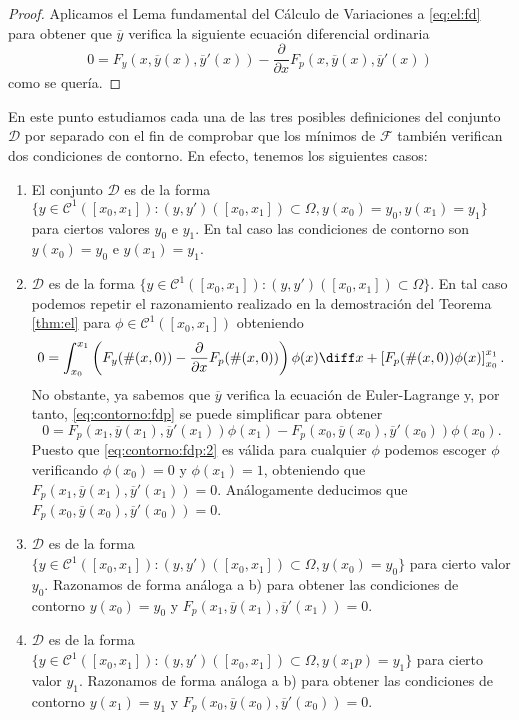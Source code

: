 \documentclass{article}
\begin{document}
\begin{proof}
  Aplicamos el Lema fundamental del Cálculo de Variaciones a \eqref{eq:el:fd} para obtener que
  $\overline{y}$ verifica la siguiente ecuación diferencial ordinaria
  \begin{equation} \label{eq:ex:edo} 0 = F_y(x, \overline{y}(x), \overline{y}'(x)) -
    \frac{\partial}{\partial x} F_p(x, \overline{y}(x), \overline{y}'(x))
  \end{equation}
  como se quería.
\end{proof}

En este punto estudiamos cada una de las tres posibles definiciones del conjunto $\mathcal{D}$ por
separado con el fin de comprobar que los mínimos de $\mathcal{F}$ también verifican dos condiciones
de contorno. En efecto, tenemos los siguientes casos:

\begin{enumerate}
\item El conjunto $\mathcal{D}$ es de la forma
  $\{y \in \mathcal{C}^1([x_0, x_1]): (y, y')([x_0, x_1]) \subset \Omega, y(x_0) = y_0, y(x_1) =
  y_1\}$ para ciertos valores $y_0$ e $y_1$. En tal caso las condiciones de contorno son
  $y(x_0) = y_0$ e $y(x_1) = y_1$.
\item $\mathcal{D}$ es de la forma
  $\{y \in \mathcal{C}^1([x_0, x_1]): (y, y')([x_0, x_1]) \subset \Omega\}$. En tal caso podemos
  repetir el razonamiento realizado en la demostración del Teorema \ref{thm:el} para
  $\phi \in \mathcal{C}^{1}([x_0, x_1])$ obteniendo
  \begin{equation} \label{eq:contorno:fdp} 0 = \int_{x_0}^{x_1} \left(F_y(\#(x, 0)) -
      \frac{\partial}{\partial x} F_p(\#(x, 0))\right) \phi(x) \diff x + \left[F_p(\#(x, 0))
      \phi(x)\right]_{x_0}^{x_1}.
  \end{equation}
  No obstante, ya sabemos que $\overline{y}$ verifica la ecuación de Euler-Lagrange y, por tanto,
  \eqref{eq:contorno:fdp} se puede simplificar para obtener
  \begin{equation} \label{eq:contorno:fdp:2} 0 = F_p(x_1, \overline{y}(x_1), \overline{y}'(x_1))
    \phi(x_1) - F_p(x_0, \overline{y}(x_0), \overline{y}'(x_0)) \phi(x_0).
  \end{equation}
  Puesto que \eqref{eq:contorno:fdp:2} es válida para cualquier $\phi$ podemos escoger $\phi$
  verificando $\phi(x_0) = 0$ y $\phi(x_1) = 1$, obteniendo que
  $F_p(x_1, \overline{y}(x_1), \overline{y}'(x_1)) = 0$. Análogamente deducimos que
  $F_p(x_0, \overline{y}(x_0), \overline{y}'(x_0)) = 0$.
\item $\mathcal{D}$ es de la forma
  $\{y \in \mathcal{C}^1([x_0, x_1]): (y, y')([x_0, x_1]) \subset \Omega, y(x_0) = y_0\}$ para
  cierto valor $y_0$. Razonamos de forma análoga a b) para obtener las condiciones de contorno
  $y(x_0) = y_0$ y $F_p(x_1, \overline{y}(x_1), \overline{y}'(x_1)) = 0$.
\item $\mathcal{D}$ es de la forma
  $\{y \in \mathcal{C}^1([x_0, x_1]): (y, y')([x_0, x_1]) \subset \Omega, y(x_1p) = y_1\}$ para
  cierto valor $y_1$. Razonamos de forma análoga a b) para obtener las condiciones de contorno
  $y(x_1) = y_1$ y $F_p(x_0, \overline{y}(x_0), \overline{y}'(x_0)) = 0$.
\end{enumerate}
\end{document}
